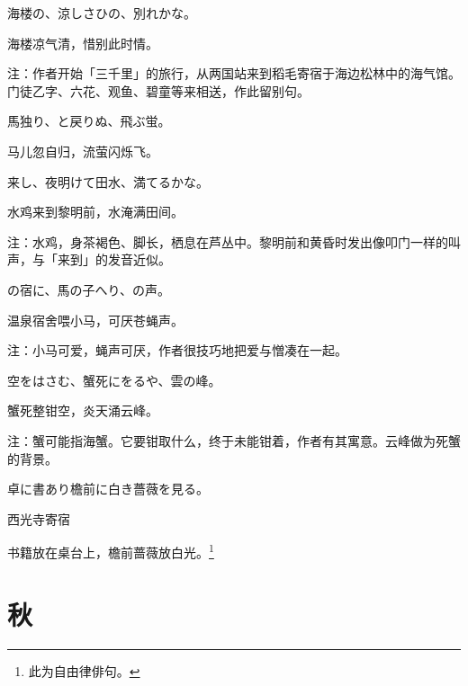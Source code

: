 \begin{haiku}
    {\FH 海楼の、涼しさひの、別れかな。}

    {\FK 海楼凉气清，惜别此时情。}

    {\FT 注：作者开始「三千里」的旅行，从两国站来到稻毛寄宿于海边松林中的海气馆。门徒乙字、六花、观鱼、碧童等来相送，作此留别句。}
\end{haiku}

\begin{haiku}
    {\FH 馬独り、と戻りぬ、飛ぶ蛍。}

    {\FK 马儿忽自归，流萤闪烁飞。}
\end{haiku}

\begin{haiku}
    {\FH {}来し、夜明けて田水、満てるかな。}

    {\FK 水鸡来到黎明前，水淹满田间。}

    {\FT 注：水鸡，身茶褐色、脚长，栖息在芦丛中。黎明前和黄昏时发出像叩门一样的叫声，与「来到」的发音近似。}
\end{haiku}

\begin{haiku}
    {\FH {}の宿に、馬の子へり、の声。}

    {\FK 温泉宿舍喂小马，可厌苍蝇声。}

    {\FT 注：小马可爱，蝇声可厌，作者很技巧地把爱与憎凑在一起。}
\end{haiku}

\begin{haiku}
    {\FH 空をはさむ、蟹死にをるや、雲の峰。}

    {\FK 蟹死整钳空，炎天涌云峰。}

    {\FT 注：蟹可能指海蟹。它要钳取什么，终于未能钳着，作者有其寓意。云峰做为死蟹的背景。}
\end{haiku}

\begin{haiku}
    {\FH 卓に書あり檐前に白き薔薇を見る。}

    {\FK 西光寺寄宿}

    {\FK 书籍放在桌台上，檐前蔷薇放白光。\footnote{\FT 此为自由律俳句。}}
\end{haiku}

\section{\FK 秋}

\setcounter{haikucounter}{0}

